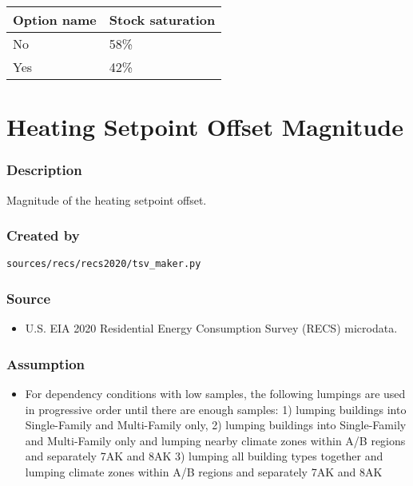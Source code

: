 \begin{longtable}[]{@{}ll@{}}
\toprule\noalign{}
Option name & Stock saturation \\
\midrule\noalign{}
\endhead
\bottomrule\noalign{}
\endlastfoot
No & 58\% \\
Yes & 42\% \\
\end{longtable}

\section{Heating Setpoint Offset
Magnitude}\label{heating_setpoint_offset_magnitude}

\subsubsection{Description}\label{description-89}

Magnitude of the heating setpoint offset.

\subsubsection{Created by}\label{created-by-89}

\texttt{sources/recs/recs2020/tsv\_maker.py}

\subsubsection{Source}\label{source-88}

\begin{itemize}
 
\item
  U.S. EIA 2020 Residential Energy Consumption Survey (RECS) microdata.
\end{itemize}

\subsubsection{Assumption}\label{assumption-53}

\begin{itemize}
 
\item
  For dependency conditions with low samples, the following lumpings are
  used in progressive order until there are enough samples: 1) lumping
  buildings into Single-Family and Multi-Family only, 2) lumping
  buildings into Single-Family and Multi-Family only and lumping nearby
  climate zones within A/B regions and separately 7AK and 8AK 3) lumping
  all building types together and lumping climate zones within A/B
  regions and separately 7AK and 8AK
\end{itemize}

